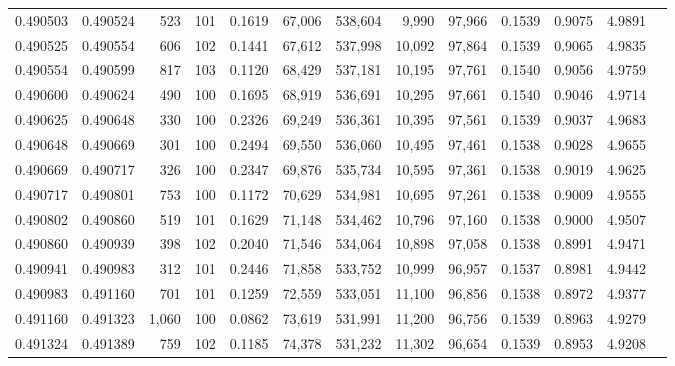 \begin{tabular}{rrrrrrrrrrrrr}
0.490503 & 0.490524 &   523 & 101 &                                     0.1619 &  67,006 & 538,604 &   9,990 &  97,966 & 0.1539 & 0.9075 & 4.9891 \\
0.490525 & 0.490554 &   606 & 102 &                                     0.1441 &  67,612 & 537,998 &  10,092 &  97,864 & 0.1539 & 0.9065 & 4.9835 \\
0.490554 & 0.490599 &   817 & 103 &                                     0.1120 &  68,429 & 537,181 &  10,195 &  97,761 & 0.1540 & 0.9056 & 4.9759 \\
0.490600 & 0.490624 &   490 & 100 &                                     0.1695 &  68,919 & 536,691 &  10,295 &  97,661 & 0.1540 & 0.9046 & 4.9714 \\
0.490625 & 0.490648 &   330 & 100 &                                     0.2326 &  69,249 & 536,361 &  10,395 &  97,561 & 0.1539 & 0.9037 & 4.9683 \\
0.490648 & 0.490669 &   301 & 100 &                                     0.2494 &  69,550 & 536,060 &  10,495 &  97,461 & 0.1538 & 0.9028 & 4.9655 \\
0.490669 & 0.490717 &   326 & 100 &                                     0.2347 &  69,876 & 535,734 &  10,595 &  97,361 & 0.1538 & 0.9019 & 4.9625 \\
0.490717 & 0.490801 &   753 & 100 &                                     0.1172 &  70,629 & 534,981 &  10,695 &  97,261 & 0.1538 & 0.9009 & 4.9555 \\
0.490802 & 0.490860 &   519 & 101 &                                     0.1629 &  71,148 & 534,462 &  10,796 &  97,160 & 0.1538 & 0.9000 & 4.9507 \\
0.490860 & 0.490939 &   398 & 102 &                                     0.2040 &  71,546 & 534,064 &  10,898 &  97,058 & 0.1538 & 0.8991 & 4.9471 \\
0.490941 & 0.490983 &   312 & 101 &                                     0.2446 &  71,858 & 533,752 &  10,999 &  96,957 & 0.1537 & 0.8981 & 4.9442 \\
0.490983 & 0.491160 &   701 & 101 &                                     0.1259 &  72,559 & 533,051 &  11,100 &  96,856 & 0.1538 & 0.8972 & 4.9377 \\
0.491160 & 0.491323 & 1,060 & 100 &                                     0.0862 &  73,619 & 531,991 &  11,200 &  96,756 & 0.1539 & 0.8963 & 4.9279 \\
0.491324 & 0.491389 &   759 & 102 &                                     0.1185 &  74,378 & 531,232 &  11,302 &  96,654 & 0.1539 & 0.8953 & 4.9208 \\

\end{tabular}
